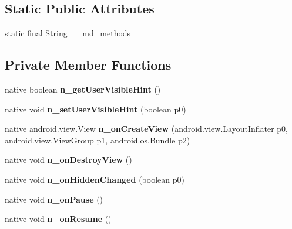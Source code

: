 \subsection*{Static Public Attributes}
\begin{DoxyCompactItemize}
\item 
static final String \hyperlink{classmd5270abb39e60627f0f200893b490a1ade_1_1FragmentContainer_a5e152354be6320af362304f8c061ed9b}{\+\_\+\+\_\+md\+\_\+methods}
\end{DoxyCompactItemize}
\subsection*{Private Member Functions}
\begin{DoxyCompactItemize}
\item 
\mbox{\label{classmd5270abb39e60627f0f200893b490a1ade_1_1FragmentContainer_a7b29e98e286b30e0311c4875185dc88f}} 
native boolean {\bfseries n\+\_\+get\+User\+Visible\+Hint} ()
\item 
\mbox{\label{classmd5270abb39e60627f0f200893b490a1ade_1_1FragmentContainer_abe08304fec0177841d7102ecbd8465a0}} 
native void {\bfseries n\+\_\+set\+User\+Visible\+Hint} (boolean p0)
\item 
\mbox{\label{classmd5270abb39e60627f0f200893b490a1ade_1_1FragmentContainer_a4fb332bbe46a024be3eeba66bee4b879}} 
native android.\+view.\+View {\bfseries n\+\_\+on\+Create\+View} (android.\+view.\+Layout\+Inflater p0, android.\+view.\+View\+Group p1, android.\+os.\+Bundle p2)
\item 
\mbox{\label{classmd5270abb39e60627f0f200893b490a1ade_1_1FragmentContainer_adfb39eed167df4be40a54a70748757f4}} 
native void {\bfseries n\+\_\+on\+Destroy\+View} ()
\item 
\mbox{\label{classmd5270abb39e60627f0f200893b490a1ade_1_1FragmentContainer_a97378e88350395d8acd4e03431aa0b92}} 
native void {\bfseries n\+\_\+on\+Hidden\+Changed} (boolean p0)
\item 
\mbox{\label{classmd5270abb39e60627f0f200893b490a1ade_1_1FragmentContainer_a2777aa4c89a97aec65ba03ef4af5d64c}} 
native void {\bfseries n\+\_\+on\+Pause} ()
\item 
\mbox{\label{classmd5270abb39e60627f0f200893b490a1ade_1_1FragmentContainer_a3d52a8ab3b57ba5469da472e7eaa1ab1}} 
native void {\bfseries n\+\_\+on\+Resume} ()
\end{DoxyCompactItemize}
